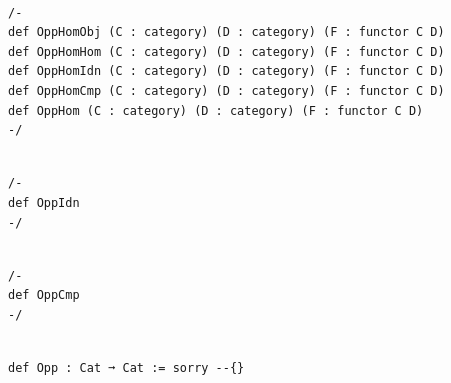 \documentclass{book}
\newcounter{lcounter}
\begin{document}
\begin{center}
\begin{tcolorbox}[width=5in,colback={white},title={\begin{center}\texttt{Lean \thelcounter} \addtocounter{lcounter}{1}  \end{center}},colbacktitle=Blue,coltitle=black]
\begin{verbatim}

/-
def OppHomObj (C : category) (D : category) (F : functor C D) 
def OppHomHom (C : category) (D : category) (F : functor C D) 
def OppHomIdn (C : category) (D : category) (F : functor C D) 
def OppHomCmp (C : category) (D : category) (F : functor C D) 
def OppHom (C : category) (D : category) (F : functor C D) 
-/

\end{verbatim}%
\end{tcolorbox}
\end{center}

\begin{center}
\begin{tcolorbox}[width=5in,colback={white},title={\begin{center}\texttt{Lean \thelcounter} \addtocounter{lcounter}{1}  \end{center}},colbacktitle=Blue,coltitle=black]
\begin{verbatim}

/-
def OppIdn
-/

\end{verbatim}%
\end{tcolorbox}
\end{center}


\begin{center}
\begin{tcolorbox}[width=5in,colback={white},title={\begin{center}\texttt{Lean \thelcounter} \addtocounter{lcounter}{1}  \end{center}},colbacktitle=Blue,coltitle=black]
\begin{verbatim}

/-
def OppCmp
-/

\end{verbatim}%
\end{tcolorbox}
\end{center}


\begin{center}
\begin{tcolorbox}[width=5in,colback={white},title={\begin{center}\texttt{Lean \thelcounter} \addtocounter{lcounter}{1}  \end{center}},colbacktitle=Blue,coltitle=black]
\begin{verbatim}

def Opp : Cat ➞ Cat := sorry --{}

\end{verbatim}%
\end{tcolorbox}
\end{center}
\end{document}
